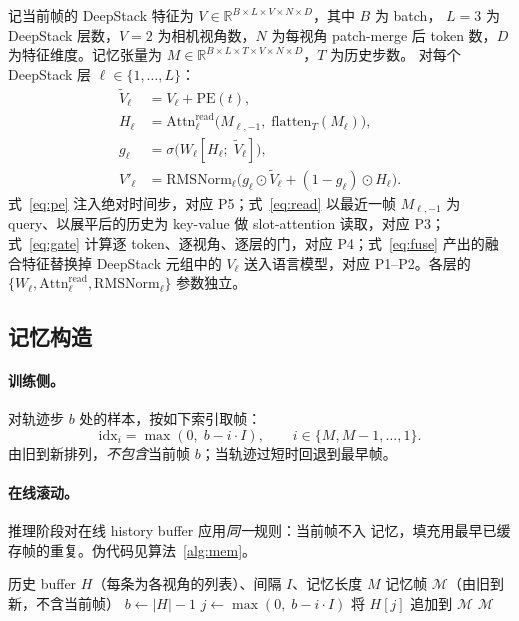 \documentclass[11pt]{ctexart}
\begin{document}
记当前帧的 DeepStack 特征为
$V \in \mathbb{R}^{B \times L \times V \times N \times D}$，其中 $B$ 为 batch，
$L{=}3$ 为 DeepStack 层数，$V{=}2$ 为相机视角数，$N$ 为每视角 patch-merge 后 token
数，$D$ 为特征维度。记忆张量为
$M \in \mathbb{R}^{B \times L \times T \times V \times N \times D}$，$T$ 为历史步数。
对每个 DeepStack 层 $\ell \in \{1, \dots, L\}$：
\begin{align}
\widetilde{V}_\ell &= V_\ell + \mathrm{PE}(t),                              \label{eq:pe}\\
H_\ell            &= \mathrm{Attn}_\ell^{\mathrm{read}}\!\big(M_{\ell,-1},\;
                      \mathrm{flatten}_T(M_\ell)\big),                      \label{eq:read}\\
g_\ell            &= \sigma\!\big(W_\ell [H_\ell ;\; \widetilde{V}_\ell]\big), \label{eq:gate}\\
V'_\ell           &= \mathrm{RMSNorm}_\ell\!\big(g_\ell \odot \widetilde{V}_\ell
                      + (1-g_\ell) \odot H_\ell\big).                        \label{eq:fuse}
\end{align}
式~\eqref{eq:pe} 注入绝对时间步，对应 P5；式~\eqref{eq:read} 以最近一帧
$M_{\ell,-1}$ 为 query、以展平后的历史为 key-value 做 slot-attention 读取，对应 P3；
式~\eqref{eq:gate} 计算逐 token、逐视角、逐层的门，对应 P4；式~\eqref{eq:fuse}
产出的融合特征替换掉 DeepStack 元组中的 $V_\ell$ 送入语言模型，对应 P1–P2。各层的
$\{W_\ell, \mathrm{Attn}_\ell^{\mathrm{read}}, \mathrm{RMSNorm}_\ell\}$ 参数独立。

\subsection{记忆构造}
\label{sec:memconstr}

\paragraph{训练侧。} 对轨迹步 $b$ 处的样本，按如下索引取帧：
\[
\mathrm{idx}_i = \max(0,\; b - i \cdot I),\qquad i \in \{M, M{-}1, \dots, 1\}.
\]
由旧到新排列，\emph{不包含}当前帧 $b$；当轨迹过短时回退到最早帧。

\paragraph{在线滚动。} 推理阶段对在线 history buffer 应用\emph{同一}规则：当前帧不入
记忆，填充用最早已缓存帧的重复。伪代码见算法~\ref{alg:mem}。

\begin{algorithm}[h]
\caption{滚动阶段在时刻 $b$ 的记忆构造}
\label{alg:mem}
\begin{algorithmic}[1]
\Require 历史 buffer $H$（每条为各视角的列表）、间隔 $I$、记忆长度 $M$
\Ensure 记忆帧 $\mathcal{M}$（由旧到新，不含当前帧）
\State $b \gets |H| - 1$
    \State $j \gets \max(0,\; b - i \cdot I)$
    \State 将 $H[j]$ 追加到 $\mathcal{M}$
\EndFor
\State \Return $\mathcal{M}$
\end{algorithmic}
\end{algorithm}
\end{document}
